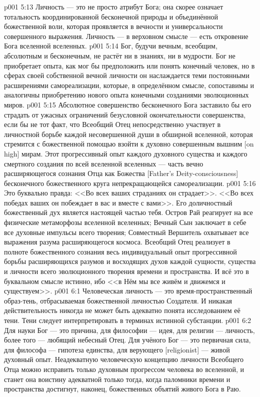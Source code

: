 \vs p001 5:13 \pc Личность --- это не просто атрибут Бога; она скорее означает тотальность координированной бесконечной природы и объединённой божественной воли, которая проявляется в вечности и универсальности совершенного выражения. Личность --- в верховном смысле --- есть откровение Бога вселенной вселенных.
\vs p001 5:14 \pc Бог, будучи вечным, всеобщим, абсолютным и бесконечным, не растёт ни в знаниях, ни в мудрости. Бог не приобретает опыта, как мог бы предположить или понять конечный человек, но в сферах своей собственной вечной личности он наслаждается теми постоянными расширениями самореализации, которые, в определённом смысле, сопоставимы и аналогичны приобретению нового опыта конечными созданиями эволюционных миров.
\vs p001 5:15 Абсолютное совершенство бесконечного Бога заставило бы его страдать от ужасных ограничений безусловной окончательности совершенства, если бы не тот факт, что Всеобщий Отец непосредственно участвует в личностной борьбе каждой несовершенной души в обширной вселенной, которая стремится с божественной помощью взойти к духовно совершенным вышним [on high] мирам. Этот прогрессивный опыт каждого духовного существа и каждого смертного создания по всей вселенной вселенных --- часть вечно расширяющегося сознания Отца как Божества [Father's Deity\hyp{}consciousness] бесконечного божественного круга непрекращающейся самореализации.
\vs p001 5:16 Это буквально правда: <<Во всех ваших страданиях он страдает>>. <<Во всех победах ваших он побеждает в вас и вместе с вами>>. Его доличностный божественный дух является настоящей частью тебя. Остров Рай реагирует на все физические метаморфозы вселенной вселенных; Вечный Сын заключает в себе все духовные импульсы всего творения; Совместный Вершитель охватывает все выражения разума расширяющегося космоса. Всеобщий Отец реализует в полноте божественного сознания весь индивидуальный опыт прогрессивной борьбы расширяющихся разумов и восходящих духов каждой сущности, существа и личности всего эволюционного творения времени и пространства. И всё это в буквальном смысле истинно, ибо <<в Нём мы все живём и движемся и существуем>>.
\vs p001 6:1 Человеческая личность --- это время\hyp{}пространственный образ\hyp{}тень, отбрасываемая божественной личностью Создателя. И никакая действительность никогда не может быть адекватно понята исследованием её тени. Тени следует интерпретировать в терминах истинной субстанции.
\vs p001 6:2 \pc Для науки Бог --- это причина, для философии --- идея, для религии --- личность, более того --- любящий небесный Отец. Для учёного Бог --- это первичная сила, для философа --- гипотеза единства, для верующего [religionist] --- живой духовный опыт. Неадекватную человеческую концепцию личности Всеобщего Отца можно исправить только духовным прогрессом человека во вселенной, и станет она воистину адекватной только тогда, когда паломники времени и пространства достигнут, наконец, божественных объятий живого Бога в Раю.

